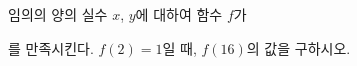 임의의 양의 실수 $x$, $y$에 대하여 함수 $f$가 \par\smallskip{}\par\smallskip\noindent 를 만족시킨다. $f(2)=1$일 때, $f(16)$의 값을 구하시오.
